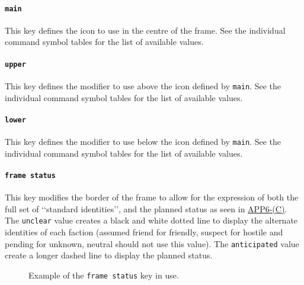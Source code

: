 \documentclass[a4paper, titlepage]{article}
\newcommand\DocLink{\href{https://www.awl.edu.pl/images/en/APP_6_C.pdf}{APP6-(C)}}
\begin{document}
\paragraph{\texttt{main}}

This key defines the icon to use in the centre of the frame. See the individual command symbol tables for the list of available values.

\paragraph{\texttt{upper}} 

This key defines the modifier to use above the icon defined by \texttt{main}. See the individual command symbol tables for the list of available values.

\paragraph{\texttt{lower}} 

This key defines the modifier to use below the icon defined by \texttt{main}. See the individual command symbol tables for the list of available values.

\paragraph{\texttt{frame status}}

This key modifies the border of the frame to allow for the expression of both the full set of \lq\lq{}standard identities\rq\rq{}, and the planned status as seen in \DocLink. The \texttt{unclear} value creates a black and white dotted line to display the alternate identities of each faction (assumed friend for friendly, suspect for hostile and pending for unknown, neutral should not use this value). The \texttt{anticipated} value create a longer dashed line to display the planned status.

\begin{figure}[H]
\centering
{}
\caption{Example of the \texttt{frame status} key in use.}
\end{figure}
\end{document}
